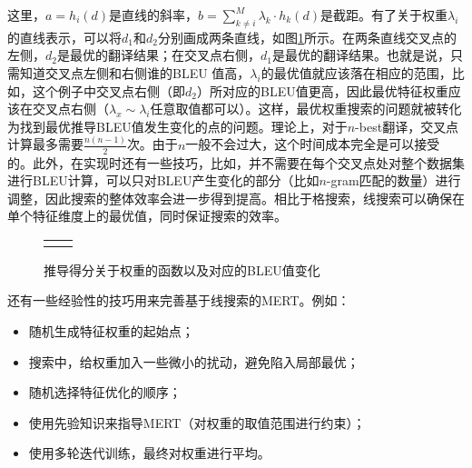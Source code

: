 \parinterval 这里，$a = h_i(d)$是直线的斜率，$b = \sum_{k \neq i}^{M} \lambda_k \cdot h_k (d)$是截距。有了关于权重$\lambda_i$的直线表示，可以将$d_1$和$d_2$分别画成两条直线，如图\ref{fig:4-25}所示。在两条直线交叉点的左侧，$d_2$是最优的翻译结果；在交叉点右侧，$d_1$是最优的翻译结果。也就是说，只需知道交叉点左侧和右侧谁的BLEU 值高，$\lambda_i$的最优值就应该落在相应的范围，比如，这个例子中交叉点右侧（即$d_2$）所对应的BLEU值更高，因此最优特征权重应该在交叉点右侧（$\lambda_x \sim \lambda_i$任意取值都可以）。这样，最优权重搜索的问题就被转化为找到最优推导BLEU值发生变化的点的问题。理论上，对于$n$-best翻译，交叉点计算最多需要$\frac{n(n-1)}{2}$次。由于$n$一般不会过大，这个时间成本完全是可以接受的。此外，在实现时还有一些技巧，比如，并不需要在每个交叉点处对整个数据集进行BLEU计算，可以只对BLEU产生变化的部分（比如$n$-gram匹配的数量）进行调整，因此搜索的整体效率会进一步得到提高。相比于格搜索，线搜索可以确保在单个特征维度上的最优值，同时保证搜索的效率。

\begin{figure}[htp]
\centering
\begin{tabular}{l l}
\subfigure{} &  \subfigure{} \\
\end{tabular}
\caption{推导得分关于权重的函数以及对应的BLEU值变化}
\label{fig:4-25}
\end{figure}

\parinterval 还有一些经验性的技巧用来完善基于线搜索的MERT。例如：

\begin{itemize}
\vspace{0.5em}
\item 随机生成特征权重的起始点；
\vspace{0.5em}
\item 搜索中，给权重加入一些微小的扰动，避免陷入局部最优；
\vspace{0.5em}
\item 随机选择特征优化的顺序；
\vspace{0.5em}
\item 使用先验知识来指导MERT（对权重的取值范围进行约束）；
\vspace{0.5em}
\item 使用多轮迭代训练，最终对权重进行平均。
\vspace{0.5em}
\end{itemize}

